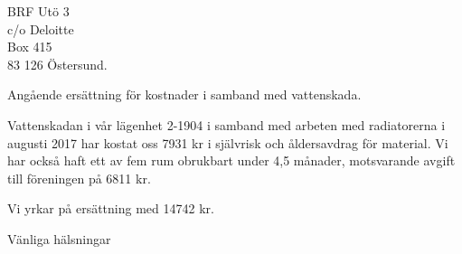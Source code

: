 \documentclass[a4paper]{letter}
\begin{document}
\address{Linus Nordberg \\ Grumsgatan 2 \\ 123 44 Farsta}
\signature{Linus Nordberg}
\begin{letter}{BRF Utö 3 \\ c/o Deloitte \\ Box 415 \\ 83 126 Östersund}.

  \opening{Angående ersättning för kostnader i samband med vattenskada.}

  Vattenskadan i vår lägenhet 2-1904 i samband med arbeten med
  radiatorerna i augusti 2017 har kostat oss 7931 kr i självrisk och
  åldersavdrag för material. Vi har också haft ett av fem rum
  obrukbart under 4,5 månader, motsvarande avgift till föreningen på
  6811 kr.

  Vi yrkar på ersättning med 14742 kr.
  
  \closing{Vänliga hälsningar}
\end{letter}
\end{document}
